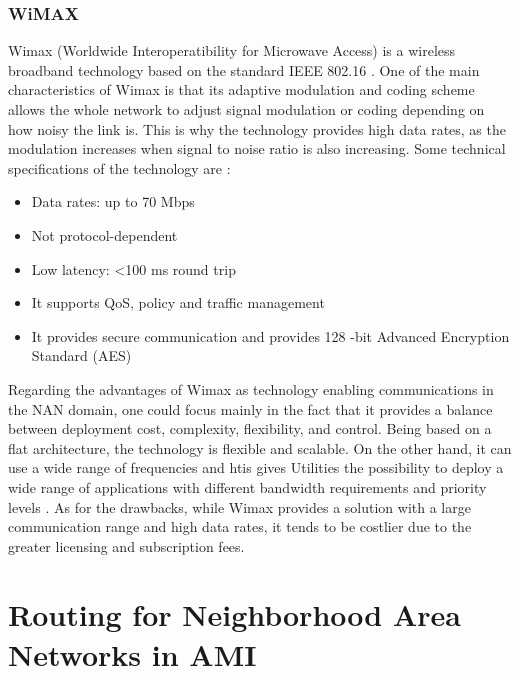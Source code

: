 \documentclass[11pt,draftclsnofoot,onecolumn]{IEEEtran}
\begin{document}
\subsubsection{WiMAX}\label{tech::wimax}

Wimax (Worldwide Interoperatibility for Microwave Access) is a wireless broadband technology based on the standard IEEE 802.16 \cite{IEEE80216}. One of the main characteristics of Wimax is that its adaptive modulation and coding scheme allows the whole network to adjust signal  modulation or coding depending on how noisy the link is. This is why the technology provides high data rates, as the modulation increases when signal to noise ratio is also increasing. Some technical specifications of the technology are \cite{Aguirre2013}:

\begin{itemize}

	\item Data rates: up to 70 Mbps
	\item Not protocol-dependent
	\item Low latency: <100 ms round trip
	\item It supports QoS, policy and traffic management
	\item It provides secure communication and provides 128 -bit Advanced Encryption Standard (AES)

\end{itemize}

Regarding the advantages of Wimax as  technology enabling communications in the NAN domain, one could focus mainly in the fact that it provides a balance between deployment cost, complexity, flexibility, and control. Being based on a flat architecture, the technology is flexible and scalable. On the other hand, it can use a wide range of frequencies and htis gives Utilities the possibility to deploy a wide range of applications with different bandwidth requirements and priority levels \cite{Senza2010}. As for the drawbacks, while Wimax provides a solution with a large communication range and high data rates, it tends to be costlier due to the greater licensing and subscription fees.


\section{Routing for Neighborhood Area Networks in AMI} \label{routing}
\end{document}
